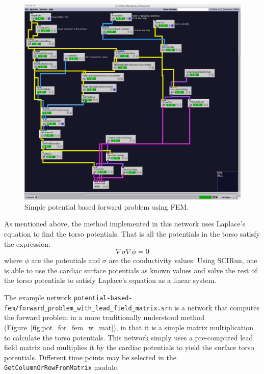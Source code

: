 \begin{figure}[H]
\begin{center}
\includegraphics[width=\textwidth]{ECGToolkitGuide_figures/potential_forward_fem.png}
\caption{Simple potential based forward problem using FEM.}
\label{fig:pot_for_fem}
\end{center}
\end{figure} 

As mentioned above, the method implemented in this network uses Laplace's equation to find the torso potentials.  That is all the potentials in the torso satisfy the expression:
$$
\nabla \sigma \nabla \phi = 0
$$
where $\phi$ are the potentials and $\sigma$ are the conductivity values.  Using SCIRun, one is able to use the cardiac surface potentials as known values and solve the rest of the torso potentials to satisfy Laplace's equation as a linear system.

The example network {\tt potential-based-fem/forward\_problem\_with\_lead\_field\_matrix.srn} is a network that computes the forward problem in a more traditionally understood method (Figure~\ref{fig:pot_for_fem_w_mat}), in that it is a simple matrix multiplication to calculate the torso potentials.  This network simply uses a pre-computed lead field matrix and multiplies it by the cardiac potentials to yield the surface torso potentials.  Different time points may be selected in the {\tt GetColumnOrRowFromMatrix} module.

